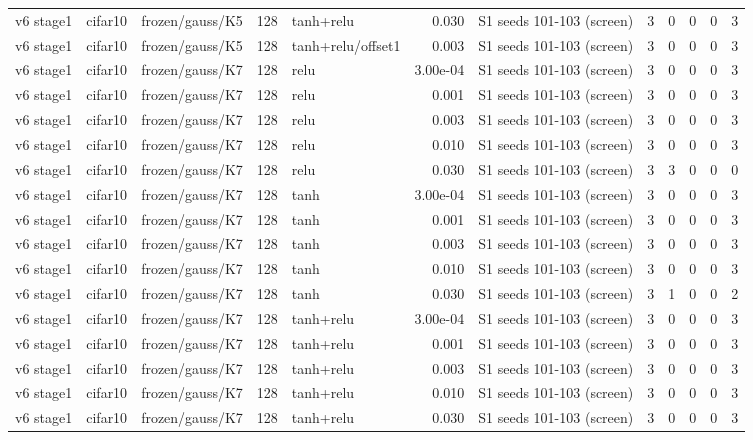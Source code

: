 \begin{table}[htbp]
{\begin{tabular}{@{}lllrlrlrrrrr@{}}
v6 stage1 & cifar10 & frozen/gauss/K5 & 128 & tanh+relu & 0.030 & S1 seeds 101-103 (screen) & 3 & 0 & 0 & 0 & 3 \\
v6 stage1 & cifar10 & frozen/gauss/K5 & 128 & tanh+relu/offset1 & 0.003 & S1 seeds 101-103 (screen) & 3 & 0 & 0 & 0 & 3 \\
v6 stage1 & cifar10 & frozen/gauss/K7 & 128 & relu & 3.00e-04 & S1 seeds 101-103 (screen) & 3 & 0 & 0 & 0 & 3 \\
v6 stage1 & cifar10 & frozen/gauss/K7 & 128 & relu & 0.001 & S1 seeds 101-103 (screen) & 3 & 0 & 0 & 0 & 3 \\
v6 stage1 & cifar10 & frozen/gauss/K7 & 128 & relu & 0.003 & S1 seeds 101-103 (screen) & 3 & 0 & 0 & 0 & 3 \\
v6 stage1 & cifar10 & frozen/gauss/K7 & 128 & relu & 0.010 & S1 seeds 101-103 (screen) & 3 & 0 & 0 & 0 & 3 \\
v6 stage1 & cifar10 & frozen/gauss/K7 & 128 & relu & 0.030 & S1 seeds 101-103 (screen) & 3 & 3 & 0 & 0 & 0 \\
v6 stage1 & cifar10 & frozen/gauss/K7 & 128 & tanh & 3.00e-04 & S1 seeds 101-103 (screen) & 3 & 0 & 0 & 0 & 3 \\
v6 stage1 & cifar10 & frozen/gauss/K7 & 128 & tanh & 0.001 & S1 seeds 101-103 (screen) & 3 & 0 & 0 & 0 & 3 \\
v6 stage1 & cifar10 & frozen/gauss/K7 & 128 & tanh & 0.003 & S1 seeds 101-103 (screen) & 3 & 0 & 0 & 0 & 3 \\
v6 stage1 & cifar10 & frozen/gauss/K7 & 128 & tanh & 0.010 & S1 seeds 101-103 (screen) & 3 & 0 & 0 & 0 & 3 \\
v6 stage1 & cifar10 & frozen/gauss/K7 & 128 & tanh & 0.030 & S1 seeds 101-103 (screen) & 3 & 1 & 0 & 0 & 2 \\
v6 stage1 & cifar10 & frozen/gauss/K7 & 128 & tanh+relu & 3.00e-04 & S1 seeds 101-103 (screen) & 3 & 0 & 0 & 0 & 3 \\
v6 stage1 & cifar10 & frozen/gauss/K7 & 128 & tanh+relu & 0.001 & S1 seeds 101-103 (screen) & 3 & 0 & 0 & 0 & 3 \\
v6 stage1 & cifar10 & frozen/gauss/K7 & 128 & tanh+relu & 0.003 & S1 seeds 101-103 (screen) & 3 & 0 & 0 & 0 & 3 \\
v6 stage1 & cifar10 & frozen/gauss/K7 & 128 & tanh+relu & 0.010 & S1 seeds 101-103 (screen) & 3 & 0 & 0 & 0 & 3 \\
v6 stage1 & cifar10 & frozen/gauss/K7 & 128 & tanh+relu & 0.030 & S1 seeds 101-103 (screen) & 3 & 0 & 0 & 0 & 3 \\

\end{tabular}}
\end{table}
